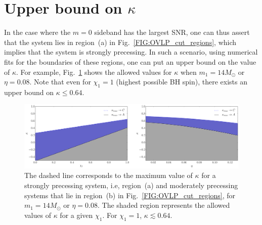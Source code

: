 \section{Upper bound on $\kappa$}
In the case where the $m=0$ sideband has the largest SNR, one can thus assert that
the system lies in region~(a) in Fig.~\ref{FIG:OVLP_cut_regions}, which
implies that the system is strongly precessing. In such a scenario, using
numerical fits for the boundaries of these regions, one can put an upper bound
on the value of $\kappa$. For example, Fig.~\ref{FIG:kappa_max_bounds} shows
the allowed values for $\kappa$ when $m_1 = 14 M_{\odot}$ or $\eta=0.08$.
Note that even for $\chi_1=1$ (highest possible BH spin), there exists an
upper bound on $\kappa
\leq 0.64$.

\begin{figure}[!htbp]
\centering
\includegraphics[width=0.65\linewidth]{images/kappa_max_bound.pdf} 
\caption{\small{The dashed line corresponds to the maximum value of $\kappa$ for
    a strongly precessing system, i.e, region~(a) and moderately precessing
    systems that lie in region~(b) in Fig.~\ref{FIG:OVLP_cut_regions}, for
    $m_1 = 14 M_{\odot}$ or $\eta=0.08$. The shaded region represents the
    allowed values of $\kappa$ for a given $\chi_1$. For $\chi_1=1$, $\kappa
    \lesssim 0.64$.}}
\label{FIG:kappa_max_bounds}
\end{figure}